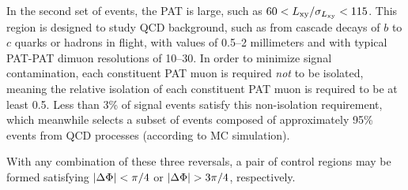 In the second set of events, the PAT \LxySig is large, such as \mbox{$60 < L_{\mathrm{xy}}/\sigma_{L_{\mathrm{xy}}} < 115$}.
This region is designed to study QCD background, such as from cascade decays of $b$ to $c$ quarks or hadrons in flight, with \cTau values of 0.5--2 millimeters and with typical PAT-PAT dimuon \Lxy resolutions of 10--30\mum.
In order to minimize signal contamination, each constituent PAT muon is required \emph{not} to be isolated, meaning the relative isolation of each constituent PAT muon is required to be at least 0.5.
Less than 3\% of \twoMu signal events satisfy this non-isolation requirement, which meanwhile selects a subset of events composed of approximately 95\% events from QCD processes (according to MC simulation).

With any combination of these three reversals, a pair of control regions may be formed satisfying $|\Delta\Phi| < \pi/4$ or $|\Delta\Phi| > 3\pi/4$, respectively.

